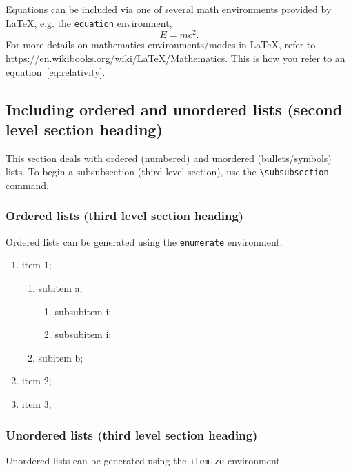 \documentclass{nato-sto}
\begin{document}
Equations can be included via one of several math environments provided by \LaTeX, e.g. the \verb|equation| environment,
\begin{equation}\label{eq:relativity}
E = mc^2.
\end{equation}
For more details on mathematics environments/modes in \LaTeX, refer to \url{https://en.wikibooks.org/wiki/LaTeX/Mathematics}. This is how you refer to an equation~\eqref{eq:relativity}.


\subsection{Including ordered and unordered lists (second level section heading)}

This section deals with ordered (numbered) and unordered (bullets/symbols) lists. To begin a subsubsection (third level section), use the \verb|\subsubsection| command.

\subsubsection{Ordered lists (third level section heading)}

Ordered lists can be generated using the \verb|enumerate| environment. 

\begin{enumerate}
\item item 1;
	\begin{enumerate}
		\item subitem a;
		\begin{enumerate}
			\item subsubitem i;
			\item subsubitem i;
		\end{enumerate}
		\item subitem b;
	\end{enumerate}
\item item 2;
\item item 3;
\end{enumerate}

\subsubsection{Unordered lists (third level section heading)}

Unordered lists can be generated using the \verb|itemize| environment.
\end{document}
